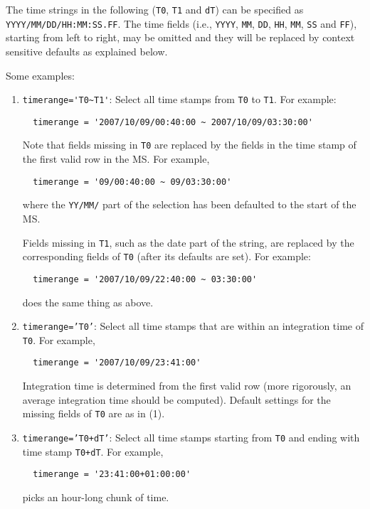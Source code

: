 The time strings in the following ({\tt T0}, {\tt T1} and {\tt dT}) 
can be specified as {\tt YYYY/MM/DD/HH:MM:SS.FF}.  
The time fields (i.e., {\tt YYYY}, {\tt MM}, {\tt DD}, {\tt HH}, 
{\tt MM}, {\tt SS} and {\tt FF}),
starting from left to right, may be omitted and they will be replaced
by context sensitive defaults as explained below.

Some examples:
\begin{enumerate}

\item {\verb!timerange='T0~T1'!}:   Select all time stamps from 
{\tt T0} to {\tt T1}.  For example:
\small
\begin{verbatim}
  timerange = '2007/10/09/00:40:00 ~ 2007/10/09/03:30:00'
\end{verbatim}
\normalsize

Note that fields missing in {\tt T0} are replaced by the fields in the
time stamp of the first valid row in the MS.  For example, 
\small
\begin{verbatim}
  timerange = '09/00:40:00 ~ 09/03:30:00'
\end{verbatim}
\normalsize
where the {\tt YY/MM/} part of the selection has been defaulted
to the start of the MS.  

Fields missing in {\tt T1}, such as
the date part of the string, are replaced by the corresponding fields
of {\tt T0} (after its defaults are set).  For example:
\small
\begin{verbatim}
  timerange = '2007/10/09/22:40:00 ~ 03:30:00'
\end{verbatim}
\normalsize
does the same thing as above.  

\item {\tt timerange='T0'}:  Select all time stamps that are within an
integration time of {\tt T0}.  For example,
\small
\begin{verbatim}
  timerange = '2007/10/09/23:41:00'
\end{verbatim}
\normalsize

Integration time is determined from the first valid row
(more rigorously, an average integration time should be computed).
Default settings for the missing fields of {\tt T0} are as in (1).

\item {\tt timerange='T0+dT'}:  Select all time stamps starting from
{\tt T0} and ending with time stamp {\tt T0+dT}.  For example,
\small
\begin{verbatim}
  timerange = '23:41:00+01:00:00'
\end{verbatim}
\normalsize
picks an hour-long chunk of time.


\end{enumerate}
